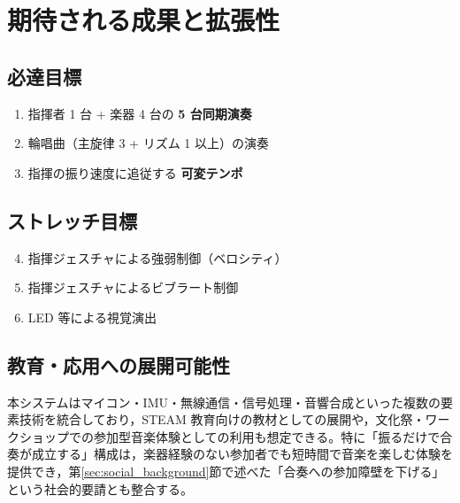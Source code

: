 \section{期待される成果と拡張性}

\subsection{必達目標}

\begin{enumerate}
  \item 指揮者 1 台 + 楽器 4 台の \textbf{5 台同期演奏}
  \item 輪唱曲（主旋律 3 + リズム 1 以上）の演奏
  \item 指揮の振り速度に追従する \textbf{可変テンポ}
\end{enumerate}

\subsection{ストレッチ目標}

\begin{enumerate}
  \setcounter{enumi}{3}
  \item 指揮ジェスチャによる強弱制御（ベロシティ）
  \item 指揮ジェスチャによるビブラート制御
  \item LED 等による視覚演出
\end{enumerate}

\subsection{教育・応用への展開可能性}

本システムはマイコン・IMU・無線通信・信号処理・音響合成といった複数の要素技術を統合しており，STEAM 教育向けの教材としての展開や，文化祭・ワークショップでの参加型音楽体験としての利用も想定できる。特に「振るだけで合奏が成立する」構成は，楽器経験のない参加者でも短時間で音楽を楽しむ体験を提供でき，第\ref{sec:social_background}節で述べた「合奏への参加障壁を下げる」という社会的要請とも整合する。
